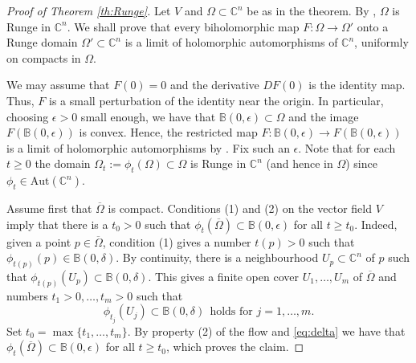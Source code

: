 \documentclass[10pt,a4paper]{amsart}
\newcommand\Aut{\mathrm{Aut}}
\newcommand\B{\mathbb{B}}
\newcommand\C{\mathbb{C}}
\begin{document}
\begin{proof}[Proof of Theorem \ref{th:Runge}] 
Let $V$ and $\Omega\subset \C^n$ be as in the theorem.
By \cite[Theorem 1.1]{ChatterjeeGorai2025X}, 
$\Omega$ is Runge in $\C^n$. We shall prove 
that every biholomorphic map $F:\Omega\to \Omega'$ 
onto a Runge domain $\Omega'\subset\C^n$ 
is a limit of holomorphic automorphisms
of $\C^n$, uniformly on compacts in $\Omega$. 

We may assume that $F(0)=0$ and the derivative
$DF(0)$ is the identity map. 
Thus, $F$ is a small perturbation of the identity near the origin.
In particular, choosing $\epsilon >0$ small enough, 
we have that $\B(0,\epsilon)\subset\Omega$ and 
the image $F(\B(0,\epsilon))$ is convex. Hence, the restricted map
$F:\B(0,\epsilon)\to F(\B(0,\epsilon))$ is a limit of  
holomorphic automorphisms by \cite[Theorem 2.1]{AndersenLempert1992}.
Fix such an $\epsilon$. Note that for each $t\ge 0$ the domain 
$\Omega_t:=\phi_t(\Omega)\subset \Omega$
is Runge in $\C^n$ (and hence in $\Omega$) since $\phi_t\in\Aut(\C^n)$. 

Assume first that $\overline \Omega$ is compact.  
Conditions (1) and (2) on the vector field 
$V$ imply that there is a $t_0>0$ such that 
$\phi_{t}(\overline\Omega)\subset \B(0,\epsilon)$ for all $t\ge t_0$.
Indeed, given a point $p\in \overline \Omega$, condition (1) 
gives a number $t(p)>0$ such that $\phi_{t(p)}(p)\in \B(0,\delta)$.
By continuity, there is a neighbourhood $U_p\subset \C^n$
of $p$ such that $\phi_{t(p)}(U_p)\subset \B(0,\delta)$.
This gives a finite open cover $U_1,\ldots,U_m$ of $\overline \Omega$
and numbers $t_1>0,\ldots,t_m>0$ such that 
\begin{equation}\label{eq:delta}
	\phi_{t_j}(U_j)\subset \B(0,\delta)\ \ \text{holds for $j=1,\ldots,m$}.
\end{equation}
Set $t_0=\max\{t_1,\ldots,t_m\}$. By property (2) of the flow 
and \eqref{eq:delta} we have that 
$\phi_t(\overline \Omega)\subset \B(0,\epsilon)$ for all $t\ge t_0$,
which proves the claim.


\end{proof}
\end{document}
